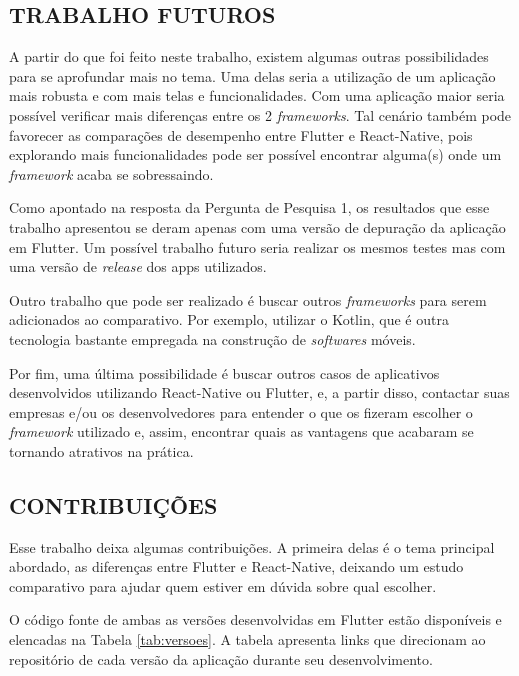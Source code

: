 \documentclass[12pt]{article}
\begin{document}
\subsection{TRABALHO FUTUROS} \label{sec:trabalhos}

A partir do que foi feito neste trabalho, existem algumas outras possibilidades para se aprofundar mais no tema. Uma delas seria a utilização de um aplicação mais robusta e com mais telas e funcionalidades. Com uma aplicação maior seria possível verificar mais diferenças entre os 2 \textit{frameworks}. Tal cenário também pode favorecer as comparações de desempenho entre Flutter e React-Native, pois explorando mais funcionalidades pode ser possível encontrar alguma(s) onde um \textit{framework} acaba se sobressaindo. 

Como apontado na resposta da Pergunta de Pesquisa 1, os resultados que esse trabalho apresentou se deram apenas com uma versão de depuração da aplicação em Flutter. Um possível trabalho futuro seria realizar os mesmos testes mas com uma versão de \textit{release} dos apps utilizados.

Outro trabalho que pode ser realizado é buscar outros \textit{frameworks} para serem adicionados ao comparativo. Por exemplo, utilizar o Kotlin, que é outra tecnologia bastante empregada na construção de \textit{softwares} móveis.

Por fim, uma última possibilidade é buscar outros casos de aplicativos desenvolvidos utilizando React-Native ou Flutter, e, a partir disso, contactar suas empresas e/ou os desenvolvedores para entender o que os fizeram escolher o \textit{framework} utilizado e, assim, encontrar quais as vantagens que acabaram se tornando atrativos na prática.

\subsection{CONTRIBUIÇÕES} \label{sec:contribuicoes}

Esse trabalho deixa algumas contribuições. A primeira delas é o tema principal abordado, as diferenças entre Flutter e React-Native, deixando um estudo comparativo para ajudar quem estiver em dúvida sobre qual escolher. 

O código fonte de ambas as versões desenvolvidas em Flutter estão disponíveis e elencadas na Tabela \ref{tab:versoes}. A tabela apresenta links que direcionam ao repositório de cada versão da aplicação durante seu desenvolvimento. 
\end{document}
